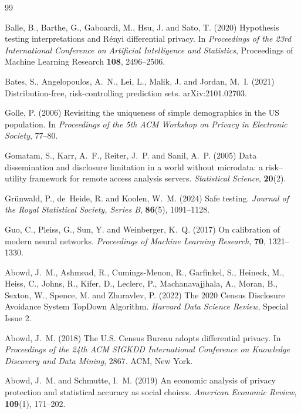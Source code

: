 \documentclass[11pt,a4paper]{article}
\theoremstyle{plain}
\theoremstyle{definition}
\begin{document}
\begin{thebibliography}{99}

Balle, B., Barthe, G., Gaboardi, M., Hsu, J. and Sato, T. (2020) Hypothesis
testing interpretations and R\'enyi differential privacy. In \emph{Proceedings
of the 23rd International Conference on Artificial Intelligence and
Statistics}, Proceedings of Machine Learning Research \textbf{108},
2496--2506.

Bates, S., Angelopoulos, A.~N., Lei, L., Malik, J. and Jordan, M.~I. (2021)
Distribution-free, risk-controlling prediction sets. arXiv:2101.02703.

Golle, P. (2006) Revisiting the uniqueness of simple demographics in the US
population. In \emph{Proceedings of the 5th ACM Workshop on Privacy in
Electronic Society}, 77--80.

Gomatam, S., Karr, A.~F., Reiter, J.~P. and Sanil, A.~P. (2005) Data
dissemination and disclosure limitation in a world without microdata: a
risk--utility framework for remote access analysis servers. \emph{Statistical
Science}, \textbf{20}(2).

Gr\"unwald, P., de~Heide, R. and Koolen, W.~M. (2024) Safe testing.
\emph{Journal of the Royal Statistical Society, Series B}, \textbf{86}(5),
1091--1128.

Guo, C., Pleiss, G., Sun, Y. and Weinberger, K.~Q. (2017)
On calibration of modern neural networks. \emph{Proceedings of Machine
Learning Research}, \textbf{70}, 1321--1330.

Abowd, J.~M., Ashmead, R., Cumings-Menon, R., Garfinkel, S., Heineck, M.,
Heiss, C., Johns, R., Kifer, D., Leclerc, P., Machanavajjhala, A., Moran, B.,
Sexton, W., Spence, M. and Zhuravlev, P. (2022) The 2020 Census Disclosure
Avoidance System TopDown Algorithm. \emph{Harvard Data Science Review},
Special Issue 2.

Abowd, J.~M. (2018) The U.S. Census Bureau adopts differential privacy. In
\emph{Proceedings of the 24th ACM SIGKDD International Conference on Knowledge
Discovery and Data Mining}, 2867. ACM, New York.

Abowd, J.~M. and Schmutte, I.~M. (2019) An economic analysis of privacy
protection and statistical accuracy as social choices. \emph{American Economic
Review}, \textbf{109}(1), 171--202.


\end{thebibliography}
\end{document}
